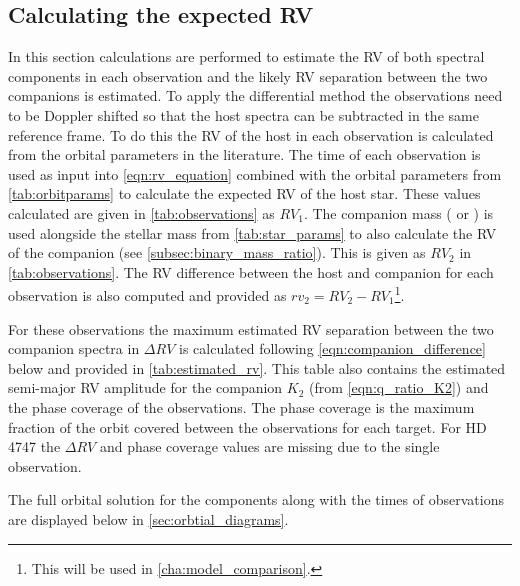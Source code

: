 
\subsection{Calculating the expected {RV}}
\label{subsec:expected_RV_calc}
In this section calculations are performed to estimate the {RV} of both spectral components in each observation and the likely {RV} separation between the two companions is estimated.
To apply the differential method the observations need to be Doppler shifted so that the host spectra can be subtracted in the same reference frame.
To do this the {RV} of the host in each observation is calculated from the orbital parameters in the literature.
The time of each observation is used as input into \cref{eqn:rv_equation} combined with the orbital parameters from \cref{tab:orbitparams} to calculate the expected {RV} of the host star.
These values calculated are given in \cref{tab:observations} as \({RV}_{1}\).
The companion mass (\Mtwo{} or \Mtwosini{}) is used alongside the stellar mass from \cref{tab:star_params} to also calculate the {RV} of the companion (see \cref{subsec:binary_mass_ratio}).
This is given as \({RV}_{2}\) in \cref{tab:observations}.
The {RV} difference between the host and companion for each observation is also computed and provided as \({rv}_{2} = {RV}_{2}-{RV}_{1}\)\footnote{This will be used in \cref{cha:model_comparison}.}.

For these observations the maximum estimated {RV} separation between the two companion spectra in \(\Delta {RV}\) is calculated following \cref{eqn:companion_difference} below and provided in \cref{tab:estimated_rv}.
This table also contains the estimated semi-major {RV} amplitude for the companion \(K_2\) (from \cref{eqn:q_ratio_K2}) and the phase coverage of the observations.
The phase coverage is the maximum fraction of the orbit covered between the observations for each target.
For {HD\,4747} the \(\Delta {RV}\) and phase coverage values are missing due to the single observation.




The full orbital solution for the components along with the times of observations are displayed below in \cref{sec:orbtial_diagrams}.


